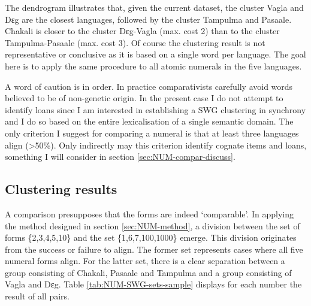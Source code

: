 The dendrogram illustrates that, given the current dataset,  the cluster Vagla
and
Dɛg are the closest languages, followed by the cluster  Tampulma and Pasaale.
Chakali is closer to the cluster Dɛg-Vagla (max. cost 2) than to the cluster
Tampulma-Pasaale  (max. cost 3). Of course the clustering result is not
representative or conclusive  as it  is based on a single word per language.
The goal here is to apply the same procedure to all atomic numerals in the five
languages. 

A word of caution is in order. In practice comparativists  carefully  avoid
words believed to be of non-genetic origin. In the present
case I do not attempt to identify loans since I am  interested in
establishing a SWG clustering in synchrony and I do so  based on the entire
lexicalisation of a 
single semantic domain.  The
only criterion I suggest  for
comparing a  numeral is that at least three languages
align (>50\%).  Only indirectly may  this criterion identify cognate items
and loans, something I will consider in section \ref{sec:NUM-compar-discuss}. 


\subsection{Clustering results}
\label{sec:clustres1}


A comparison presupposes that the forms are indeed `comparable'. In applying
the method designed in section \ref{sec:NUM-method}, a division between the set
of forms \{2,3,4,5,10\} and the set
\{1,6,7,100,1000\} emerge. This division originates from the success or failure 
to align. The former set represents cases where all five numeral
forms align.
For  the latter set, there is a clear separation between a group consisting
of Chakali, Pasaale and Tampulma and a group consisting of Vagla and Dɛg. Table
\ref{tab:NUM-SWG-sets-sample} displays for each number the result of all pairs.

